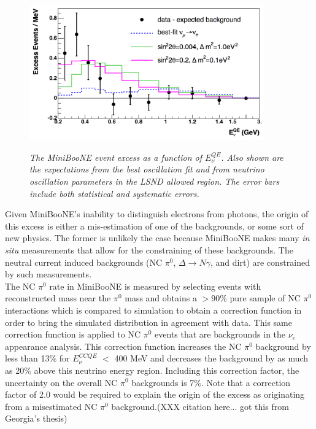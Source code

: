 \begin{figure}[ht!]
\centering
	\includegraphics[width=0.9\textwidth]{Figures/MB_published_excess_fits.png} \\
\caption{\textit{The MiniBooNE event excess as a function of $E_\nu^{QE}$. Also shown are the expectations from the best oscillation fit and from neutrino oscillation parameters in the LSND allowed region. The error bars include both statistical and systematic errors.}}\label{MB_published_excess_fits_fig}
\end{figure}

Given MiniBooNE's inability to distinguish electrons from photons, the origin of this excess is either a mis-estimation of one of the backgrounds, or some sort of new physics. The former is unlikely the case because MiniBooNE makes many \textit{in situ} measurements that allow for the constraining of these backgrounds. The neutral current induced backgrounds (NC $\pi^0$, $\Delta\rightarrow N\gamma$, and dirt) are constrained by such measurements.\\

The NC $\pi^0$ rate in MiniBooNE is measured by selecting events with reconstructed mass near the $\pi^0$ mass and obtains a $>90$\% pure sample of NC $\pi^0$ interactions which is compared to simulation to obtain a correction function in order to bring the simulated distribution in agreement with data. This same correction function is applied to NC $\pi^0$ events that are backgrounds in the $\nu_e$ appearance analysis. This correction function increases the NC $\pi^0$ background by less than 13\% for $E_\nu^{CCQE}$ $<$ 400 MeV and decreases the background by as much as 20\% above this neutrino energy region. Including this correction factor, the uncertainty on the overall NC $\pi^0$ backgrounds is 7\%. Note that a correction factor of 2.0 would be required to explain the origin of the excess as originating from a misestimated NC $\pi^0$ background.(XXX citation here... got this from Georgia's thesis)\\

